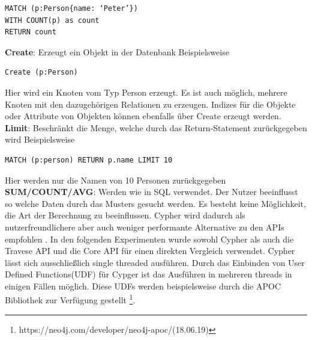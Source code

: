 \begin{Verbatim}[frame=single]
MATCH (p:Person{name: ‘Peter’})  
WITH COUNT(p) as count  
RETURN count
\end{Verbatim} 
\textbf{Create}: Erzeugt ein Objekt in der Datenbank Beispielsweise 
\begin{Verbatim}[frame=single]
Create (p:Person)
\end{Verbatim}
Hier wird ein Knoten vom Typ Person erzeugt. Es ist auch möglich, mehrere Knoten mit den dazugehörigen Relationen zu erzeugen. Indizes  für die Objekte oder Attribute von Objekten können ebenfalls über Create erzeugt werden.\newline
\textbf{Limit}: Beschränkt die Menge, welche durch das Return-Statement zurückgegeben wird Beispielsweise
\begin{Verbatim}[frame=single]
MATCH (p:person) RETURN p.name LIMIT 10
\end{Verbatim} 
Hier werden nur die Namen  von 10 Personen zurückgegeben\newline
\textbf{SUM/COUNT/AVG}: Werden wie in SQL verwendet. \newline \newline
Der Nutzer beeinflusst so welche Daten durch  das Musters gesucht werden. Es besteht keine Möglichkeit, die Art der Berechnung zu beeinflussen. Cypher wird dadurch als nutzerfreundlichere aber auch weniger performante Alternative zu den APIs empfohlen \parencite{vukotic2015neo4j}. In den folgenden Experimenten wurde sowohl Cypher als auch die Travese API und die Core API für einen direkten Vergleich verwendet. Cypher lässt sich ausschließlich  single threaded ausführen. Durch das Einbinden von User Defined Functions(UDF) für Cypger ist das Ausführen in mehreren threads in einigen Fällen möglich. Diese UDFs werden beispielsweise durch die APOC Bibliothek zur Verfügung gestellt \footnote{https://neo4j.com/developer/neo4j-apoc/(18.06.19)}.

